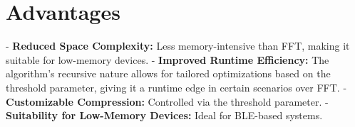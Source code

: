 \documentclass[conference]{IEEEtran}
\begin{document}
\section{Advantages}
- \textbf{Reduced Space Complexity:} Less memory-intensive than FFT, making it suitable for low-memory devices.
- \textbf{Improved Runtime Efficiency:} The algorithm's recursive nature allows for tailored optimizations based on the threshold parameter, giving it a runtime edge in certain scenarios over FFT.
- \textbf{Customizable Compression:} Controlled via the threshold parameter.
- \textbf{Suitability for Low-Memory Devices:} Ideal for BLE-based systems.
\end{document}
